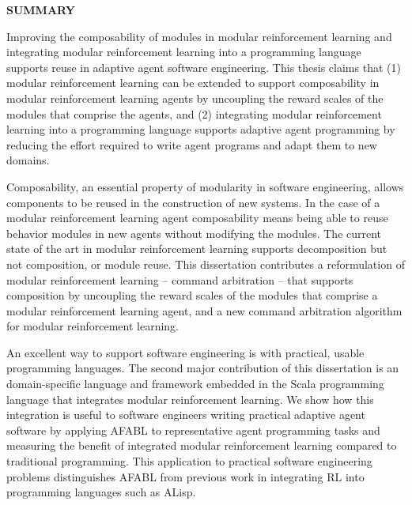 \clearpage
\begin{centering}
\textbf{SUMMARY}\\
\vspace{\baselineskip}
\end{centering}

Improving the composability of modules in modular reinforcement learning and integrating modular reinforcement learning into a programming language supports reuse in adaptive agent software engineering.  This thesis claims that (1) modular reinforcement learning can be extended to support composability in modular reinforcement learning agents by uncoupling the reward scales of the modules that comprise the agents, and (2) integrating modular reinforcement learning into a programming language supports adaptive agent programming by reducing the effort required to write agent programs and adapt them to new domains.

Composability, an essential property of modularity in software engineering, allows components to be reused in the construction of new systems.  In the case of a modular reinforcement learning agent composability means being able to reuse behavior modules in new agents without modifying the modules.  The current state of the art in modular reinforcement learning supports decomposition but not composition, or module reuse.  This dissertation contributes a reformulation of modular reinforcement learning -- command arbitration -- that supports composition by uncoupling the reward scales of the modules that comprise a modular reinforcement learning agent, and a new command arbitration algorithm for modular reinforcement learning.

An excellent way to support software engineering is with practical, usable programming languages.  The second major contribution of this dissertation is an domain-specific language and framework embedded in the Scala programming language that integrates modular reinforcement learning.  We show how this integration is useful to software engineers writing practical adaptive agent software by applying AFABL to representative agent programming tasks and measuring the benefit of integrated modular reinforcement learning compared to traditional programming.  This application to practical software engineering problems distinguishes AFABL from previous work in integrating RL into programming languages such as ALisp.

